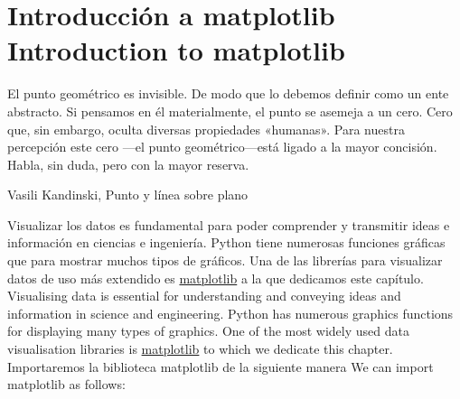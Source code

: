 \chapter{Introducción a matplotlib\\ Introduction to matplotlib}
\epigraph{El punto geométrico es invisible. De modo que lo debemos definir como un ente abstracto. Si pensamos en él materialmente, el punto se asemeja a un cero.
Cero que, sin embargo, oculta diversas propiedades «humanas». Para nuestra percepción este cero —el punto geométrico—está ligado a la mayor concisión. Habla, sin duda, pero con la mayor reserva.}{Vasili Kandinski, Punto y línea sobre plano}
\begin{paracol}{2}
    Visualizar los datos es fundamental para poder comprender y transmitir ideas e información en ciencias e ingeniería.
    Python tiene numerosas funciones gráficas que para mostrar muchos tipos de gráficos. Una de las librerías para visualizar datos de uso más extendido es \href{https://matplotlib.org/stable/}{matplotlib} a la que dedicamos este capítulo.
    \switchcolumn
    Visualising data is essential for understanding and conveying ideas and information in science and engineering.
    Python has numerous graphics functions for displaying many types of graphics. One of the most widely used data visualisation libraries is \href{https://matplotlib.org/stable/}{matplotlib} to which we dedicate this chapter.
    \switchcolumn
    Importaremos la biblioteca matplotlib de la siguiente manera
    \switchcolumn
    We can import matplotlib as follows:
\end{paracol}

